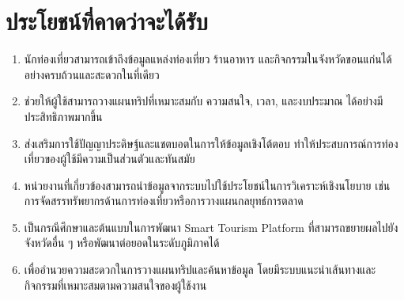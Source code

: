 \section{ประโยชน์ที่คาดว่าจะได้รับ}

\begin{enumerate}[label=\thesection.\arabic*, ref=\thesection.\arabic*, leftmargin=2.2cm]
\item นักท่องเที่ยวสามารถเข้าถึงข้อมูลแหล่งท่องเที่ยว ร้านอาหาร  และกิจกรรมในจังหวัดขอนแก่นได้อย่างครบถ้วนและสะดวกในที่เดียว
\item ช่วยให้ผู้ใช้สามารถวางแผนทริปที่เหมาะสมกับ ความสนใจ, เวลา, และงบประมาณ ได้อย่างมีประสิทธิภาพมากขึ้น
\item ส่งเสริมการใช้ปัญญาประดิษฐ์และแชตบอตในการให้ข้อมูลเชิงโต้ตอบ ทำให้ประสบการณ์การท่องเที่ยวของผู้ใช้มีความเป็นส่วนตัวและทันสมัย
\item หน่วยงานที่เกี่ยวข้องสามารถนำข้อมูลจากระบบไปใช้ประโยชน์ในการวิเคราะห์เชิงนโยบาย เช่น การจัดสรรทรัพยากรด้านการท่องเที่ยวหรือการวางแผนกลยุทธ์การตลาด
\item เป็นกรณีศึกษาและต้นแบบในการพัฒนา Smart Tourism Platform ที่สามารถขยายผลไปยังจังหวัดอื่น ๆ หรือพัฒนาต่อยอดในระดับภูมิภาคได้
\item เพื่ออำนวยความสะดวกในการวางแผนทริปและค้นหาข้อมูล โดยมีระบบแนะนำเส้นทางและกิจกรรมที่เหมาะสมตามความสนใจของผู้ใช้งาน
\end{enumerate}
